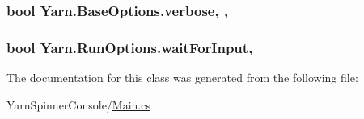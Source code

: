 \hypertarget{a00022_ada4d83d1756918f362d55f6649b82b17}{
\subsubsection[{verbose}]{\setlength{\rightskip}{0pt plus 5cm}bool Yarn.\-Base\-Options.\-verbose\hspace{0.3cm}{\ttfamily [get]}, {\ttfamily [set]}, {\ttfamily [inherited]}}}\label{a00022_ada4d83d1756918f362d55f6649b82b17}
\hypertarget{a00133_a4b385e83338d14947c4d840d2d1ee266}{
\subsubsection[{wait\-For\-Input}]{\setlength{\rightskip}{0pt plus 5cm}bool Yarn.\-Run\-Options.\-wait\-For\-Input\hspace{0.3cm}{\ttfamily [get]}, {\ttfamily [set]}}}\label{a00133_a4b385e83338d14947c4d840d2d1ee266}


The documentation for this class was generated from the following file\-:\begin{DoxyCompactItemize}
\item 
Yarn\-Spinner\-Console/\hyperlink{a00274}{Main.\-cs}\end{DoxyCompactItemize}
